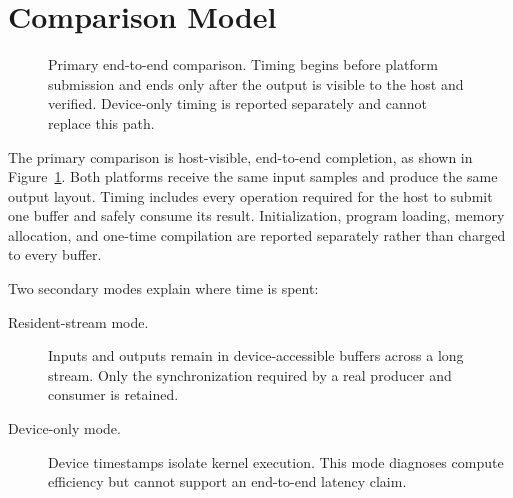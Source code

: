 \documentclass[10pt,twocolumn,twoside]{article}
\begin{document}
\section{Comparison Model}

\begin{figure}[t]
\centering
{}
\caption{Primary end-to-end comparison. Timing begins before platform
submission and ends only after the output is visible to the host and verified.
Device-only timing is reported separately and cannot replace this path.}
\label{fig:model}
\end{figure}

The primary comparison is host-visible, end-to-end completion, as shown in
Figure~\ref{fig:model}. Both platforms receive the same input samples and
produce the same output layout. Timing includes every operation required for
the host to submit one buffer and safely consume its result. Initialization,
program loading, memory allocation, and one-time compilation are reported
separately rather than charged to every buffer.

Two secondary modes explain where time is spent:

\begin{description}
  \item[Resident-stream mode.] Inputs and outputs remain in device-accessible
  buffers across a long stream. Only the synchronization required by a real
  producer and consumer is retained.
  \item[Device-only mode.] Device timestamps isolate kernel execution. This
  mode diagnoses compute efficiency but cannot support an end-to-end latency
  claim.
\end{description}
\end{document}
